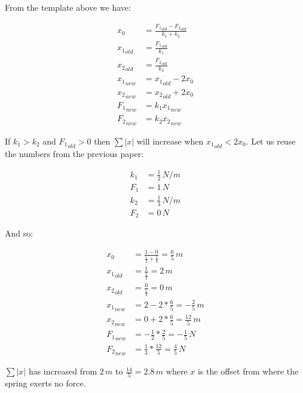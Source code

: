 \documentclass[]{../common/elementary-physics}
\begin{document}
From the template above we have:

\begin{subequations}
\begin{align}
x_0 &= \frac{{F_1}_{old}-{F_2}_{old}}{k_1 + k_2} \\
{x_1}_{old} &= \frac{{F_1}_{old}}{k_1} \\
{x_2}_{old} &= \frac{{F_2}_{old}}{k_2} \\
{x_1}_{new} &= {x_1}_{old} -2 x_0 \\
{x_2}_{new} &= {x_2}_{old} +2 x_0 \\
{F_1}_{new} &= k_1 {x_1}_{new} \\
{F_2}_{new} &= k_2 {x_2}_{new}
\end{align}
\end{subequations}

If $k_1 > k_2$ and ${F_1}_{old} > 0$ then $\sum |x|$ will increase when ${x_1}_{old} < 2 x_0$.
Let us reuse the numbers from the previous paper\cite{ef2ch}:

\begin{subequations}
\begin{align}
k_1 &= \frac{1}{2} \, N/m \\
F_1 &= 1 \, N \\
k_2 &= \frac{1}{3} \, N/m \\
F_2 &= 0 \, N
\end{align}
\end{subequations}

And so:

\begin{subequations}
\begin{align}
x_0 &= \frac{1-0}{\frac{1}{2} + \frac{1}{3}} = \frac{6}{5} \, m \\
{x_1}_{old} &= \frac{1}{\frac{1}{2}} = 2 \, m \\
{x_2}_{old} &= \frac{0}{\frac{1}{3}} = 0 \, m \\
{x_1}_{new} &= 2 -2 * \frac{6}{5} = -\frac{2}{5} \, m \\
{x_2}_{new} &= 0 +2 * \frac{6}{5} = \frac{12}{5} \, m \\
{F_1}_{new} &= - \frac{1}{2} * \frac{2}{5} = -\frac{1}{5} \, N \\
{F_2}_{new} &= \frac{1}{3} * \frac{12}{5} = \frac{4}{5} \, N
\end{align}
\end{subequations}

$\sum |x|$ has increased from $2 \, m$ to $\frac{14}{5} = 2.8 \, m$ where $x$ is the offset from where the spring exerts no force.
\end{document}
